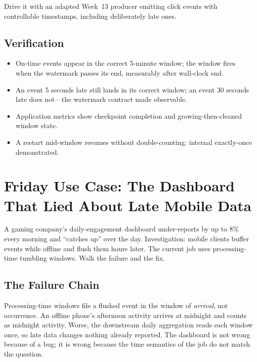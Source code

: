 Drive it with an adapted Week~13 producer emitting click events with controllable timestamps, including deliberately late ones.

\subsection*{Verification}
\begin{itemize}
    \item On-time events appear in the correct 5-minute window; the window fires when the watermark passes its end, measurably after wall-clock end.
    \item An event 5 seconds late still lands in its correct window; an event 30 seconds late does not---the watermark contract made observable.
    \item Application metrics show checkpoint completion and growing-then-cleaned window state.
    \item A restart mid-window resumes without double-counting: internal exactly-once demonstrated.
\end{itemize}

\section{Friday Use Case: The Dashboard That Lied About Late Mobile Data}
A gaming company's daily-engagement dashboard under-reports by up to 8\% every morning and ``catches up'' over the day. Investigation: mobile clients buffer events while offline and flush them hours later. The current job uses processing-time tumbling windows. Walk the failure and the fix.

\subsection{The Failure Chain}
Processing-time windows file a flushed event in the window of \emph{arrival}, not occurrence. An offline phone's afternoon activity arrives at midnight and counts as midnight activity. Worse, the downstream daily aggregation reads each window once, so late data changes nothing already reported. The dashboard is not wrong because of a bug; it is wrong because the time semantics of the job do not match the question.


